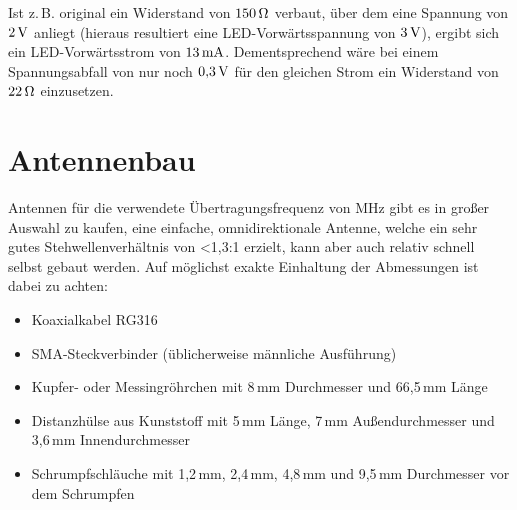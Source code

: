 \documentclass[pdftex, parskip, numbers=noenddot, toc=listof]{scrbook}
\begin{document}
	Ist z.\,B. original ein Widerstand von $\unit[150]{\Omega}$ verbaut, über dem eine Spannung von $\unit[2]{V}$ anliegt (hieraus resultiert eine LED-Vorwärtsspannung von $\unit[3]{V}$), ergibt sich ein LED-Vorwärtsstrom von $\unit[13]{mA}$. Dementsprechend wäre bei einem Spannungsabfall von nur noch $\unit[0{,}3]{V}$ für den gleichen Strom ein Widerstand von $\unit[22]{\Omega}$ einzusetzen.


	\section{Antennenbau}

	Antennen für die verwendete Übertragungsfrequenz von \unit[868]{MHz} gibt es in großer Auswahl zu kaufen, eine einfache, omnidirektionale Antenne, welche ein sehr gutes Stehwellenverhältnis von <1{,}3:1 erzielt, kann aber auch relativ schnell selbst gebaut werden. Auf möglichst exakte Einhaltung der Abmessungen ist dabei zu achten:
	\begin{itemize}
		\item Koaxialkabel RG316
		\item SMA-Steckverbinder (üblicherweise männliche Ausführung)
		\item Kupfer- oder Messingröhrchen mit 8\,mm Durchmesser und 66{,}5\,mm Länge
		\item Distanzhülse aus Kunststoff mit 5\,mm Länge, 7\,mm Außendurchmesser und 3{,}6\,mm Innendurchmesser
		\item Schrumpfschläuche mit 1{,}2\,mm, 2{,}4\,mm, 4{,}8\,mm und 9{,}5\,mm Durchmesser vor dem Schrumpfen
	\end{itemize}
\end{document}
